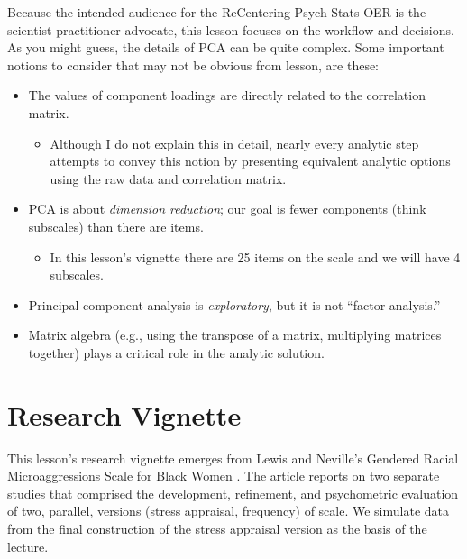 \documentclass[
  english,
]{book}
\providecommand{\tightlist}{%
  \setlength{\itemsep}{0pt}\setlength{\parskip}{0pt}}
\begin{document}
Because the intended audience for the ReCentering Psych Stats OER is the scientist-practitioner-advocate, this lesson focuses on the workflow and decisions. As you might guess, the details of PCA can be quite complex. Some important notions to consider that may not be obvious from lesson, are these:

\begin{itemize}
\tightlist
\item
  The values of component loadings are directly related to the correlation matrix.

  \begin{itemize}
  \tightlist
  \item
    Although I do not explain this in detail, nearly every analytic step attempts to convey this notion by presenting equivalent analytic options using the raw data and correlation matrix.
  \end{itemize}
\item
  PCA is about \emph{dimension reduction}; our goal is fewer components (think subscales) than there are items.

  \begin{itemize}
  \tightlist
  \item
    In this lesson's vignette there are 25 items on the scale and we will have 4 subscales.
  \end{itemize}
\item
  Principal component analysis is \emph{exploratory}, but it is not ``factor analysis.''
\item
  Matrix algebra (e.g., using the transpose of a matrix, multiplying matrices together) plays a critical role in the analytic solution.
\end{itemize}

\hypertarget{research-vignette-5}{%
\section{Research Vignette}\label{research-vignette-5}}

This lesson's research vignette emerges from Lewis and Neville's Gendered Racial Microaggressions Scale for Black Women \citeyearpar{lewis_construction_2015}. The article reports on two separate studies that comprised the development, refinement, and psychometric evaluation of two, parallel, versions (stress appraisal, frequency) of scale. We simulate data from the final construction of the stress appraisal version as the basis of the lecture.
\end{document}
